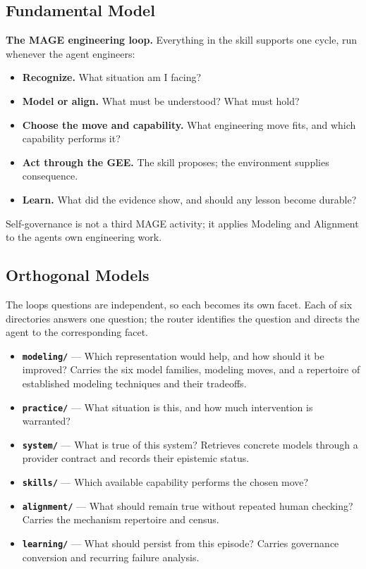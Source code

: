 \subsection{Fundamental Model}\label{heading:fundamental-model-1}

\textbf{The MAGE engineering loop.} Everything in the skill supports one cycle, run whenever the agent engineers:

\begin{itemize}
\tightlist
\item
  \textbf{Recognize.} What situation am I facing?
\item
  \textbf{Model or align.} What must be understood? What must hold?
\item
  \textbf{Choose the move and capability.} What engineering move fits, and which capability performs it?
\item
  \textbf{Act through the GEE.} The skill proposes; the environment supplies consequence.
\item
  \textbf{Learn.} What did the evidence show, and should any lesson become durable?
\end{itemize}

Self-governance is not a third MAGE activity; it applies Modeling and Alignment to the agent\textquotesingle s own engineering work.

\subsection{Orthogonal Models}\label{heading:orthogonal-models-1}

The loop\textquotesingle s questions are independent, so each becomes its own facet. Each of six directories answers one question; the router identifies the question and directs the agent to the corresponding facet.

\begin{itemize}
\tightlist
\item
  \textbf{\texttt{modeling/}} --- Which representation would help, and how should it be improved? Carries the six model families, modeling moves, and a repertoire of established modeling techniques and their tradeoffs.
\item
  \textbf{\texttt{practice/}} --- What situation is this, and how much intervention is warranted?
\item
  \textbf{\texttt{system/}} --- What is true of this system? Retrieves concrete models through a provider contract and records their epistemic status.
\item
  \textbf{\texttt{skills/}} --- Which available capability performs the chosen move?
\item
  \textbf{\texttt{alignment/}} --- What should remain true without repeated human checking? Carries the mechanism repertoire and census.
\item
  \textbf{\texttt{learning/}} --- What should persist from this episode? Carries governance conversion and recurring failure analysis.
\end{itemize}

